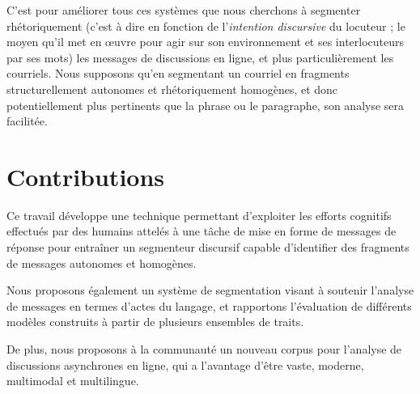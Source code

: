 C'est pour améliorer tous ces systèmes que nous cherchons à segmenter rhétoriquement (c'est à dire en fonction de l'\textit{intention discursive} du locuteur ; le moyen qu'il met en œuvre pour agir sur son environnement et ses interlocuteurs par ses mots) les messages de discussions en ligne, et plus particulièrement les courriels. Nous supposons qu'en segmentant un courriel en fragments structurellement autonomes et rhétoriquement homogènes, et donc potentiellement plus pertinents que la phrase ou le paragraphe, son analyse sera facilitée.

\section{Contributions}

Ce travail développe une technique permettant d'exploiter les efforts cognitifs effectués par des humains attelés à une tâche de mise en forme de messages de réponse pour entraîner un segmenteur discursif capable d'identifier des fragments de messages autonomes et homogènes.

Nous proposons également un système de segmentation visant à soutenir l'analyse de messages en termes d'actes du langage, et rapportons l'évaluation de différents modèles construits à partir de plusieurs ensembles de traits.

De plus, nous proposons à la communauté un nouveau corpus pour l'analyse de discussions asynchrones en ligne, qui a l'avantage d'être vaste, moderne, multimodal et multilingue.